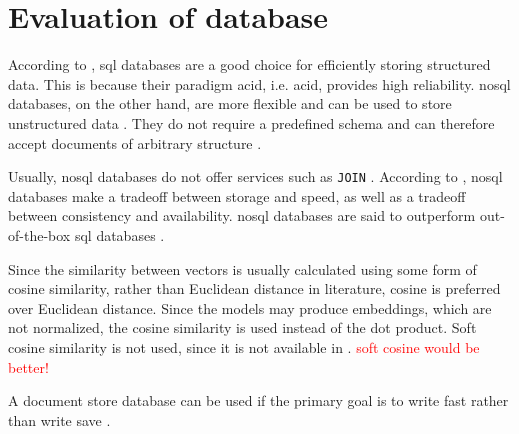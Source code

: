 \section{Evaluation of database}\label{subsec:evaluation-db}

According to \cite{flask_book2018}, \ac{sql} databases are a good choice for efficiently storing structured data.
This is because their paradigm \acs{acid}, i.e. \acl{acid}, provides high reliability.
\ac{nosql} databases, on the other hand, are more flexible and can be used to store unstructured data \cite{flask_book2018}.
They do not require a predefined schema and can therefore accept documents of arbitrary structure \cite{flask2018}.

Usually, \ac{nosql} databases do not offer services such as \texttt{JOIN} \cite{flask2018}.
According to \citeauthor{flask2018}, \ac{nosql} databases make a tradeoff between storage and speed, as well as a tradeoff between consistency and availability.
\ac{nosql} databases are said to outperform out-of-the-box \ac{sql} databases \cite{flask2018}.

Since the similarity between vectors is usually calculated using some form of cosine similarity, 
rather than Euclidean distance in literature, cosine is preferred over Euclidean distance. 
Since the models may produce embeddings, which are not normalized, the cosine similarity is used instead of the dot product.
Soft cosine similarity is not used, since it is not available in \databaseName{}.
\textcolor{red}{soft cosine would be better!}

A document store database can be used if the primary goal is to write fast rather than write save \cite{flask2018}.